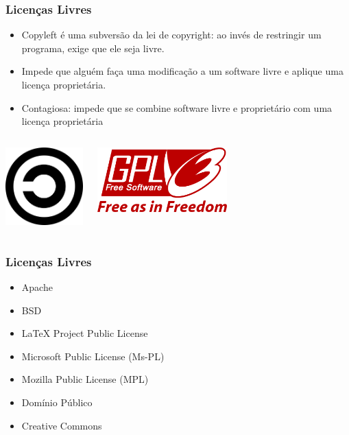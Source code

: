 \documentclass{beamer}
\begin{document}
\begin{frame}
   \frametitle{Licenças Livres}
   \begin{itemize}
   \item Copyleft é uma subversão da lei de copyright: ao invés de restringir um programa, exige que ele seja livre.
   \item Impede que alguém faça uma modificação a um software livre e aplique uma licença proprietária.
   \item Contagiosa: impede que se combine software livre e proprietário com uma licença proprietária
   \end{itemize}
   \begin{columns}
     \column{4cm}
     \begin{center}
       \includegraphics[width=3cm]{images/copyleft.png}
     \end{center}
     \column{7cm}
     \begin{center}
       \includegraphics[width=5cm]{images/GPLv3_Logo.png}
     \end{center}
 \end{columns}
\end{frame}

\begin{frame}
  \frametitle{Licenças Livres}
  \begin{itemize}
  \item Apache
  \item BSD
  \item LaTeX Project Public License
  \item Microsoft Public License (Ms-PL)
  \item Mozilla Public License (MPL)
  \item Domínio Público
  \item Creative Commons
  \end{itemize}
\end{frame}
\end{document}
